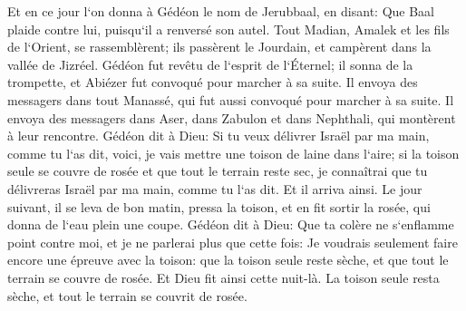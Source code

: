 \verse Et en ce jour l`on donna à Gédéon le nom de Jerubbaal, en disant: Que Baal plaide contre lui, puisqu`il a renversé son autel. 
\verse Tout Madian, Amalek et les fils de l`Orient, se rassemblèrent; ils passèrent le Jourdain, et campèrent dans la vallée de Jizréel. 
\verse Gédéon fut revêtu de l`esprit de l`Éternel; il sonna de la trompette, et Abiézer fut convoqué pour marcher à sa suite. 
\verse Il envoya des messagers dans tout Manassé, qui fut aussi convoqué pour marcher à sa suite. Il envoya des messagers dans Aser, dans Zabulon et dans Nephthali, qui montèrent à leur rencontre. 
\verse Gédéon dit à Dieu: Si tu veux délivrer Israël par ma main, comme tu l`as dit, 
\verse voici, je vais mettre une toison de laine dans l`aire; si la toison seule se couvre de rosée et que tout le terrain reste sec, je connaîtrai que tu délivreras Israël par ma main, comme tu l`as dit. 
\verse Et il arriva ainsi. Le jour suivant, il se leva de bon matin, pressa la toison, et en fit sortir la rosée, qui donna de l`eau plein une coupe. 
\verse Gédéon dit à Dieu: Que ta colère ne s`enflamme point contre moi, et je ne parlerai plus que cette fois: Je voudrais seulement faire encore une épreuve avec la toison: que la toison seule reste sèche, et que tout le terrain se couvre de rosée. 
\verse Et Dieu fit ainsi cette nuit-là. La toison seule resta sèche, et tout le terrain se couvrit de rosée. 

\chapter{}

